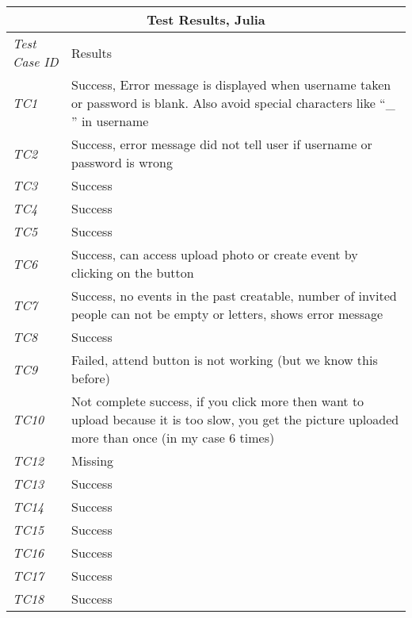 \begin{minipage}{\linewidth}
\setlength{\tabcolsep}{15pt}
\centering
{}
\begin{tabular}{ |l|p{70mm}| }
	\hline
	\multicolumn{2}{|c|}{\cellcolor{gray!25} \textbf{Test Results, Julia}} \\
	\hline
	\it{\cellcolor{gray!25}Test Case ID} & {\cellcolor{gray!25} Results } \\
	\hline
	\it{\cellcolor{gray!25}TC1} & Success, 
Error message is displayed when username taken or password is blank. Also avoid special characters like “\_ ” in username \\ \hline
	\it{\cellcolor{gray!25}TC2} & Success, error message did not tell user if username or password is wrong \\ \hline
	\it{\cellcolor{gray!25}TC3} & Success \\ \hline
	\it{\cellcolor{gray!25}TC4} & Success \\ \hline
	\it{\cellcolor{gray!25}TC5} & Success \\ \hline
	\it{\cellcolor{gray!25}TC6} & Success, can access upload photo or create event by clicking on the button \\ \hline
	\it{\cellcolor{gray!25}TC7} & Success, no events in the past creatable, number of invited people can not be empty or letters, shows error message \\ \hline
	\it{\cellcolor{gray!25}TC8} & Success \\ \hline
	\it{\cellcolor{gray!25}TC9} & Failed, attend button is not working (but we know this before) \\ \hline
	\it{\cellcolor{gray!25}TC10} & Not complete success, if you click more then want to upload because it is too slow, you get the picture uploaded more than once (in my case 6 times) \\ \hline
	\it{\cellcolor{gray!25}TC12} & Missing \\ \hline
	\it{\cellcolor{gray!25}TC13} & Success \\ \hline
	\it{\cellcolor{gray!25}TC14} & Success \\ \hline
	\it{\cellcolor{gray!25}TC15} & Success \\ \hline
	\it{\cellcolor{gray!25}TC16} & Success \\ \hline
	\it{\cellcolor{gray!25}TC17} & Success \\ \hline
	\it{\cellcolor{gray!25}TC18} & Success \\ \hline
\end{tabular}
\medskip
\end{minipage}
